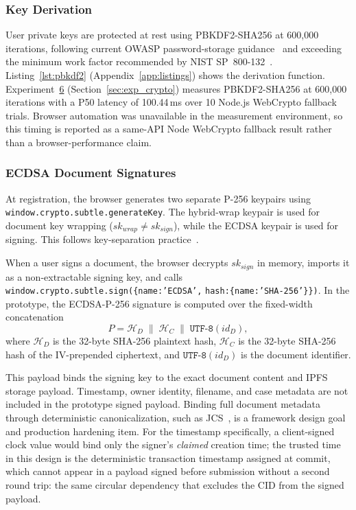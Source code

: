 \documentclass[preprint,12pt]{elsarticle}
\begin{document}


\subsubsection{Key Derivation}
User private keys are protected at rest using PBKDF2-SHA256 at
600,000 iterations, following current OWASP password-storage guidance~\cite{owaspPasswordStorage2024} and exceeding the minimum work factor recommended by NIST SP~800-132~\cite{nist800132}.
Listing~\ref{lst:pbkdf2} (Appendix~\ref{app:listings}) shows the derivation function. Experiment~\hyperref[sec:exp_crypto]{6} (Section~\ref{sec:exp_crypto}) measures PBKDF2-SHA256 at
600,000 iterations with a P50 latency of 100.44\,ms over 10 Node.js WebCrypto fallback trials. Browser automation was unavailable in the
measurement environment, so this timing is reported as a same-API Node
WebCrypto fallback result rather than a browser-performance claim.



\subsubsection{ECDSA Document Signatures}
\label{sec:ecdsa}
At registration, the browser generates two separate P-256 keypairs using
\texttt{window.crypto.subtle.generateKey}. The hybrid-wrap keypair is used for
document key wrapping ($sk_{wrap} \neq sk_{sign}$), while the ECDSA
keypair is used for signing. This follows key-separation
practice~\cite{nist800131a}.

When a user signs a document, the browser decrypts $sk_{sign}$ in memory,
imports it as a non-extractable signing key, and calls
\texttt{window.crypto.subtle.sign(}\allowbreak\texttt{\{name:'ECDSA',}\allowbreak
\texttt{hash:\{name:'SHA-256'\}\})}. In the prototype, the \mbox{ECDSA-P-256}
signature is computed over the fixed-width concatenation
\begin{equation}
P = \mathcal{H}_D \;\|\; \mathcal{H}_C \;\|\;
    \texttt{UTF-8}(id_D),
\label{eq:sigpayload}
\end{equation}
where $\mathcal{H}_D$ is the 32-byte SHA-256 plaintext hash,
$\mathcal{H}_C$ is the 32-byte SHA-256 hash of the IV-prepended
ciphertext, and $\texttt{UTF-8}(id_D)$ is the document identifier.

This payload binds the signing key to the exact document content and IPFS
storage payload. Timestamp, owner identity, filename, and case metadata
are not included in the prototype signed payload. Binding full document
metadata through deterministic canonicalization, such as JCS~\cite{rfc8785jcs},
is a framework design goal and production hardening item. For the
timestamp specifically, a client-signed clock value would bind only the
signer's \emph{claimed} creation time; the trusted time in this design
is the deterministic transaction timestamp assigned at commit, which
cannot appear in a payload signed before submission without a second
round trip: the same circular dependency that excludes the CID from
the signed payload.
\end{document}
